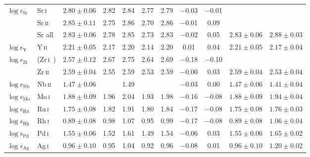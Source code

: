 \documentclass[traditabstract]{aa}
\newcommand{\ph}{\phantom{$-$}}
\newcommand{\altsri}{Sr\,\textsc{i}}
\newcommand{\altsrii}{Sr\,\textsc{ii}}
\newcommand{\altyii}{Y\,\textsc{ii}}
\newcommand{\altzri}{Zr\,\textsc{i}}
\newcommand{\altzrii}{Zr\,\textsc{ii}}
\newcommand{\altnbii}{Nb\,\textsc{ii}}
\newcommand{\altmoi}{Mo\,\textsc{i}}
\newcommand{\altrui}{Ru\,\textsc{i}}
\newcommand{\altrhi}{Rh\,\textsc{i}}
\newcommand{\altpdi}{Pd\,\textsc{i}}
\newcommand{\altagi}{Ag\,\textsc{i}}
\newcommand{\sri}{\altsri\ }
\newcommand{\srii}{\altsrii\ }
\newcommand{\yii}{\altyii\ }
\newcommand{\zri}{\altzri\ }
\newcommand{\zrii}{\altzrii\ }
\newcommand{\nbii}{\altnbii\ }
\newcommand{\moi}{\altmoi\ }
\newcommand{\rui}{\altrui\ }
\newcommand{\rhi}{\altrhi\ }
\newcommand{\pdi}{\altpdi\ }
\newcommand{\agi}{\altagi\ }
\begin{document}
\begin{table}[p]
\begin{tabular}{l l c c c c c c c c c}
$\log \epsilon_\mathrm{Sr}$     & \sri    & $2.80\pm0.06$ & 2.82 & 2.84 & 2.77 & 2.79 & $-$0.03 & $-$0.01 & &            \\
                                & \srii   & $2.85\pm0.11$ & 2.75 & 2.86 & 2.70 & 2.86 & $-$0.01 & \ph0.09 &               &                          \\
                                & Sr all  & $2.83\pm0.06$ & 2.78 & 2.85 & 2.73 & 2.83 & $-$0.02 & \ph0.05 &  $2.83\pm0.06$              &    $2.88\pm0.03$           \vspace{1mm}\\
$\log \epsilon_\mathrm{Y}$      & \yii    & $2.21\pm0.05$ & 2.17 & 2.20 & 2.14 & 2.20 & \ph0.01 & \ph0.04 & $2.21\pm0.05$ & $2.17\pm0.04$\vspace{1mm}\\
$\log \epsilon_\mathrm{Zr}$     & (\zri)  & $2.57\pm0.12$ & 2.67 & 2.75 & 2.64 & 2.69 & $-$0.18 & $-$0.10 & &            \\
                                & \zrii   & $2.59\pm0.04$ & 2.55 & 2.59 & 2.53 & 2.59 & $-$0.00 & \ph0.03 &  $2.59\pm0.04$              &     $2.53\pm0.04$          \vspace{1mm}\\
$\log \epsilon_\mathrm{Nb}$     & \nbii   & $1.47\pm0.06$ &      & 1.49 &      &      & $-$0.03 & \ph0.00 & $1.47\pm0.06$ & $1.41\pm0.04$\vspace{1mm}\\
$\log \epsilon_\mathrm{Mo}$     & \moi    & $1.88\pm0.09$ & 1.96 & 2.04 & 1.93 & 1.98 & $-$0.16 & $-$0.08 & $1.88\pm0.09$ & $1.94\pm0.04$\vspace{1mm}\\
$\log \epsilon_\mathrm{Ru}$     & \rui    & $1.75\pm0.08$ & 1.82 & 1.91 & 1.80 & 1.84 & $-$0.17 & $-$0.08 & $1.75\pm0.08$ & $1.76\pm0.03$\vspace{1mm}\\
$\log \epsilon_\mathrm{Rh}$     & \rhi    & $0.89\pm0.08$ & 0.98 & 1.07 & 0.95 & 0.99 & $-$0.17 & $-$0.08 & $0.89\pm0.08$ & $1.06\pm0.04$\vspace{1mm}\\
$\log \epsilon_\mathrm{Pd}$     & \pdi    & $1.55\pm0.06$ & 1.52 & 1.61 & 1.49 & 1.54 & $-$0.06 & \ph0.03 & $1.55\pm0.06$ & $1.65\pm0.02$\vspace{1mm}\\
$\log \epsilon_\mathrm{Ag}$     & \agi    & $0.96\pm0.10$ & 0.95 & 1.04 & 0.92 & 0.96 & $-$0.08 & \ph0.01 & $0.96\pm0.10$ & $1.20\pm0.02$\vspace{1mm}\\

\end{tabular}
\end{table}
\end{document}
